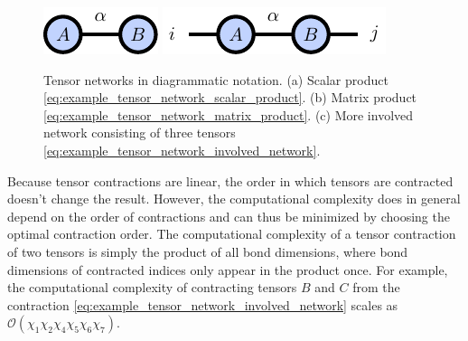 \begin{figure}[h]
	\centering
	\subcaptionbox{\label{fig:basic_tensor_networks_matrix_vector_product}}
	{%
		\raisebox{\dimexpr.5\ht\largestimage-.5\height}
		{%
			\includegraphics[scale=1]{figures/tikz/Tensor_Networks/basic_networks/basic_networks_a.pdf}
		}
	}
	\subcaptionbox{\label{fig:basic_tensor_networks_matrix_product}}
	{%
		\raisebox{\dimexpr.5\ht\largestimage-.5\height}
		{%
			\includegraphics[scale=1]{figures/tikz/Tensor_Networks/basic_networks/basic_networks_b.pdf}
		}
	}
	\subcaptionbox{\label{fig:basic_tensor_networks_involved_contraction}}
	{%
		\usebox{\largestimage}
	}
	\caption{Tensor networks in diagrammatic notation. (a) Scalar product \eqref{eq:example_tensor_network_scalar_product}. (b) Matrix product \eqref{eq:example_tensor_network_matrix_product}. (c) More involved network consisting of three tensors \eqref{eq:example_tensor_network_involved_network}.}
	\label{fig:basic_tensor_network_diagrams}
\end{figure}
Because tensor contractions are linear, the order in which tensors are contracted doesn't change the result. However, the computational complexity does in general depend on the order of contractions and can thus be minimized by choosing the optimal contraction order. The computational complexity of a tensor contraction of two tensors is simply the product of all bond dimensions, where bond dimensions of contracted indices only appear in the product once. For example, the computational complexity of contracting tensors $B$ and $C$ from the contraction \eqref{eq:example_tensor_network_involved_network} scales as $\mathcal{O}(\chi_1\chi_2\chi_4\chi_5\chi_6\chi_7)$. \par
